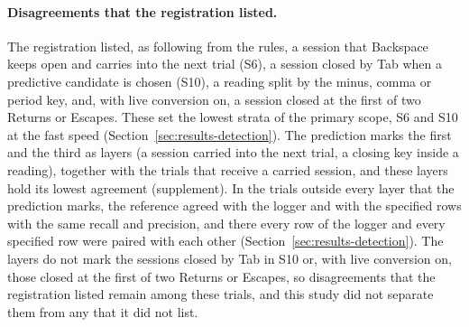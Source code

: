 \paragraph{Disagreements that the registration listed.} The registration listed, as following from the rules, a session
that Backspace keeps open and carries into the next trial (S6), a session closed by Tab when a predictive candidate is
chosen (S10), a reading split by the minus, comma or period key, and, with live conversion on, a session closed at the
first of two Returns or Escapes. These set the lowest strata of the primary scope, S6 and S10 at the fast speed
(Section~\ref{sec:results-detection}). The prediction marks the first and the third as layers (a session carried into
the next trial, a closing key inside a reading), together with the trials that receive a carried session, and these
layers hold its lowest agreement (supplement). In the trials outside every layer that the prediction marks, the
reference agreed with the logger and with the specified rows with the same recall and precision, and there every row
of the logger and every specified row were paired with each other (Section~\ref{sec:results-detection}). The layers
do not mark the
sessions closed by Tab in S10 or, with live conversion on, those closed at the first of two Returns or Escapes, so
disagreements that the registration listed remain among these trials, and this study did not separate them from any
that it did not list.

